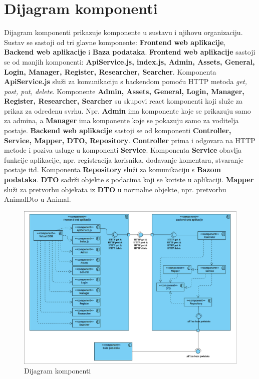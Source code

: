 			\eject
		\section{Dijagram komponenti}
		
			 Dijagram komponenti prikazuje komponente u sustavu i njihovu organizaciju. Sustav se sastoji od tri glavne komponente: \textbf{Frontend web aplikacije}, \textbf{Backend web aplikacije} i \textbf{Baza podataka}. \textbf{Frontend web aplikacije} sastoji se od manjih komponenti: \textbf{ApiService.js, index.js, Admin, Assets, General, Login, Manager, Register, Researcher, Searcher}. Komponenta \textbf{ApiService.js} služi za komunikaciju s backendom pomoću HTTP metoda \textit{get, post, put, delete}. Komponente \textbf{Admin, Assets, General, Login, Manager, Register, Researcher, Searcher} su skupovi react komponenti koji služe za prikaz za određenu svrhu. Npr. \textbf{Admin} ima komponente koje se prikazuju samo za admina, a \textbf{Manager} ima komponente koje se pokazuju samo za voditelja postaje. \textbf{Backend web aplikacije} sastoji se od komponenti \textbf{Controller, Service, Mapper, DTO, Repository}. \textbf{Controller} prima i odgovara na HTTP metode i poziva usluge u komponenti \textbf{Service}. Komponenta \textbf{Service} obavlja funkcije aplikacije, npr. registracija korisnika, dodavanje komentara, stvaranje postaje itd. Komponenta \textbf{Repository} služi za komunikaciju s \textbf{Bazom podataka}. \textbf{DTO} sadrži objekte s podacima koji se koriste u aplikaciji. \textbf{Mapper} služi za pretvorbu objekata iz \textbf{DTO} u normalne objekte, npr. pretvorbu AnimalDto u Animal.
			 
			 
			 \begin{figure}[H]
			 	\includegraphics[scale=0.45]{dijagrami/dijagram_komponenti2.png}
			 	\centering
			 	\caption{Dijagram komponenti}
			 	\label{fig:promjene}
			 \end{figure}